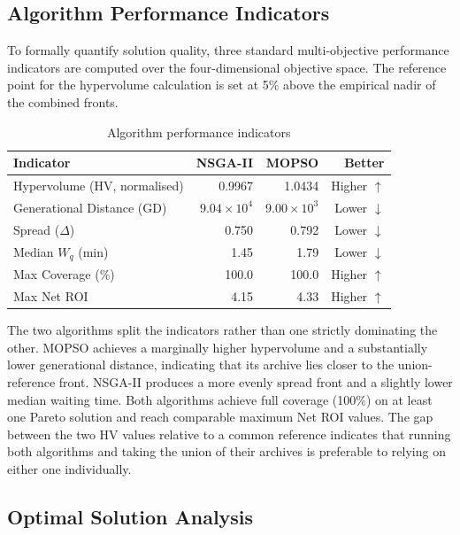 \subsection{Algorithm Performance Indicators}

To formally quantify solution quality, three standard
multi-objective performance indicators are computed over the
four-dimensional objective space. The reference point for the
hypervolume calculation is set at 5\% above the empirical nadir of
the combined fronts.

\begin{table}[H]
\centering
\caption{Algorithm performance indicators}
\label{tab:performance}
\begin{tabular}{lrrr}
\toprule
Indicator & NSGA-II & MOPSO & Better \\
\midrule
Hypervolume (HV, normalised)        & 0.9967  & 1.0434  & Higher $\uparrow$ \\
Generational Distance (GD)          & $9.04 \times 10^{4}$ & $9.00 \times 10^{3}$ & Lower $\downarrow$ \\
Spread ($\Delta$)                   & 0.750   & 0.792   & Lower $\downarrow$ \\
Median $W_q$ (min)                  & 1.45    & 1.79    & Lower $\downarrow$ \\
Max Coverage (\%)                   & 100.0   & 100.0   & Higher $\uparrow$ \\
Max Net ROI                         & 4.15    & 4.33    & Higher $\uparrow$ \\
\bottomrule
\end{tabular}
\end{table}

The two algorithms split the indicators rather than one strictly
dominating the other. MOPSO achieves a marginally higher
hypervolume and a substantially lower generational distance,
indicating that its archive lies closer to the union-reference
front. NSGA-II produces a more evenly spread front and a slightly
lower median waiting time. Both algorithms achieve full coverage
(100\%) on at least one Pareto solution and reach comparable
maximum Net ROI values. The gap between the two HV values relative
to a common reference indicates that running both algorithms and
taking the union of their archives is preferable to relying on
either one individually.

\subsection{Optimal Solution Analysis}

